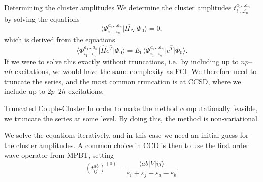 \documentclass[UKenglish,aspectratio=169]{beamer}
\begin{document}
\begin{frame}{Determining the cluster amplitudes}
    We determine the cluster amplitudes $t_{i_1 \ldots i_n}^{a_1 \ldots a_n}$ by solving the equations
    \begin{equation}
        \Big\langle \Phi_{i_1 \ldots i_n}^{a_1 \ldots a_n} \vert \overline{H_N} \vert \Phi_0 \Big\rangle = 0,
    \end{equation}
    which is derived from the equations
    \begin{equation}
        \Big\langle \Phi_{i_1 \ldots i_n}^{a_1 \ldots a_n} \vert \hat{H}  e^{\hat{T}} \vert \Phi_0 \Big\rangle = E_0 \Big\langle \Phi_{i_1 \ldots i_n}^{a_1 \ldots a_n} \vert e^{\hat{T}} \vert \Phi_0 \Big\rangle.
    \end{equation}
    If we were to solve this exactly without truncations, i.e.\ by including up to $np$--$nh$ excitations, we would have the same complexity as FCI. %
    We therefore need to truncate the series, and the most common truncation is at CCSD, where we include up to $2p$--$2h$ excitations.
\end{frame}

\begin{frame}{Truncated Couple-Cluster}
    In order to make the method computationally feasible, we truncate the series at some level.
    By doing this, the method is non-variational.

    \bigskip

    We solve the equations iteratively, and in this case we need an initial guess for the cluster amplitudes.
    A common choice in CCD is then to use the first order wave operator from MPBT, setting
    \begin{equation}
        (t_{ij}^{ab})^{(0)} = \frac{
            \langle ab \vert V \vert ij \rangle
        }{
            \varepsilon_i + \varepsilon_j - \varepsilon_a - \varepsilon_b
        }.
    \end{equation}
\end{frame}
\end{document}
